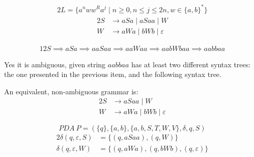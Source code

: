 \documentclass[docid=2018/19]{tcom_exam}
\begin{document}
{\pagebreak
{}
\begin{alignat*}{2}
	L=\{a^n w w^R a^j \mid n \geq 0, n \leq j \leq 2n, w \in \{a,b\}^*\}
\end{alignat*}
\begin{alignat*}{2}
	S &\rightarrow aSa\mid aSaa\mid W\\
	W &\rightarrow aWa\mid bWb\mid \varepsilon
\end{alignat*}
\begin{minipage}[c]{0.68\textwidth}
	\begin{alignat*}{12}
		S \implies aSa \implies aaSaa \implies aaWaa \implies aabWbaa \implies aabbaa
	\end{alignat*}
\end{minipage}
\begin{minipage}[c]{0.3\textwidth}
	\begin{center}
	\end{center}
\end{minipage}
Yes it is ambiguous, given string $aabbaa$ has at least two different syntax trees: the one presented in the previous item, and the following syntax tree.
\begin{center}
\end{center}
An equivalent, non-ambiguous grammar is:
\begin{alignat*}{2}
	S &\rightarrow aSaa\mid W\\
	W &\rightarrow aWa\mid bWb\mid \varepsilon
\end{alignat*}
\begin{minipage}[c]{0.49\textwidth}
	\begin{equation*}
		PDA~P=(\{q\},\{a,b\},\{a,b,S,T,W,V\},\delta,q,S)
	\end{equation*}
	\begin{alignat*}{2}
		\delta(q,\varepsilon,S)&=\{(q,aSaa),(q,W)\} \\
		\delta(q,\varepsilon,W)&=\{(q,aWa),(q,bWb),(q,\varepsilon)\}\\

\end{alignat*}
\end{minipage}}
\end{document}

